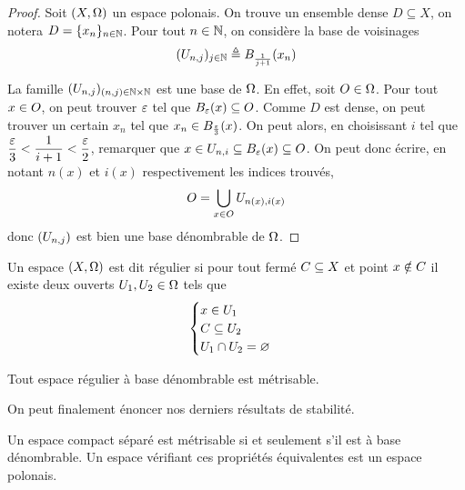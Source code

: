 \begin{proof}
  Soit $(X,\topo)$ un espace polonais. On trouve un ensemble dense
  $D\subseteq X$, on notera $D = \{x_n\}_{n\in\bN}$. Pour tout
  $n\in\bN$, on considère la base de voisinages
  \[(\varOp_{n,j})_{j\in \bN} \defeq \boule{x_n}{\frac{1}{j+1}}\]

  La famille $(\varOp_{n,j})_{(n,j)\in\bN\times\bN}$ est une base de $\topo$. En
  effet, soit $\varOpB\in\topo$. Pour tout $x\in \varOpB$, on peut trouver
  $\vareps$ tel que $\boule{x}{\vareps}\subseteq \varOpB$. Comme $D$ est dense,
  on peut trouver un certain $x_n$ tel que
  $x_n \in \boule{x}{\frac{\vareps}{3}}$. On peut alors, en choisissant $i$ tel
  que $\dfrac{\vareps}{3} < \dfrac{1}{i+1} < \dfrac{\vareps}{2}$, remarquer
  que $x\in \varOp_{n,i}\subseteq \boule{x}{\vareps}\subseteq \varOpB$. On peut
  donc écrire, en notant $n(x)$ et $i(x)$ respectivement les indices trouvés,
  \[\varOpB = \bigcup_{x\in \varOpB} \varOp_{n(x),i(x)}\]
  donc $(\varOp_{n,j})$ est bien une base dénombrable de $\topo$.
\end{proof}

\begin{definition}
  Un espace $(X,\topo)$ est dit régulier si pour tout fermé $\varCl\subseteq X$
  et point $x\notin \varCl$ il existe deux ouverts $\varOp_1,\varOp_2\in\topo$
  tels que
  \[\begin{cases}
    x\in \varOp_1\\
    \varCl\subseteq \varOp_2\\
    \varOp_1\cap \varOp_2 = \vide
  \end{cases}\]
\end{definition}

\begin{theorem}\label{desc.thm.urysohn}
  Tout espace régulier à base dénombrable est métrisable.
\end{theorem}

\noindent
On peut finalement énoncer nos derniers résultats de stabilité.

\begin{proposition}\label{desc.prop.second}
  Un espace compact séparé est métrisable si et seulement s'il est à base
  dénombrable. Un espace vérifiant ces propriétés équivalentes est un espace
  polonais.
\end{proposition}

